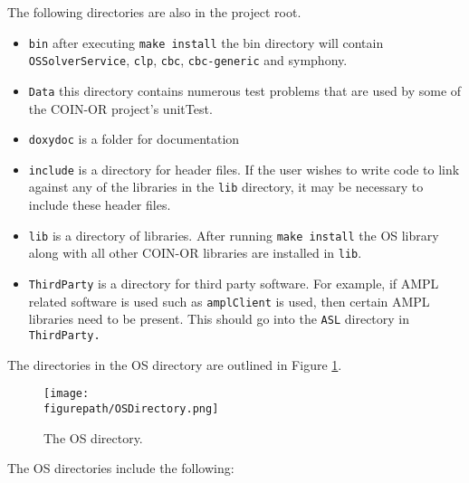 \documentclass[11pt]{article}
\newcommand{\figurepath}{./figures}
\newcounter{Fig}
\renewcommand{\_}{{\char"5F}}
\renewcommand{\{}{{\char"7B}}
\renewcommand{\}}{{\char"7D}}
\renewcommand{\^}{{\char"0D}}
\renewcommand{\'}{{\char"0D}}
\begin{document}
The following directories are also in the project root. 
\begin{itemize}
\item {\tt bin} after executing {\tt make install} the bin directory will contain {\tt OSSolverService}, {\tt clp}, {\tt cbc},  {\tt cbc-generic} and {symphony}.

\item {\tt Data} this directory contains numerous test problems that are used by some of the COIN-OR project's unitTest.

\item {\tt doxydoc} is a folder for documentation

\item {\tt include} is a directory for header files. If the user wishes to write code to link against any of the libraries in the {\tt lib} directory, it may be necessary to include these header files.

\item {\tt lib} is a directory of libraries. After running {\tt make install} the OS library along with all other COIN-OR libraries are installed in {\tt lib}.

\item {\tt ThirdParty} is a  directory for third party software. For example, if AMPL related software is used such as {\tt amplClient} is used, then certain AMPL libraries need to be present. This should go into the {\tt ASL} directory in {\tt ThirdParty.}
\end{itemize}




The directories in the OS directory are outlined in Figure \ref{figure:osdirectory}.


\begin{figure}
\centering
\texttt{[image: \\figurepath/OSDirectory.png]}
\caption{The OS directory.} 
\label{figure:osdirectory}
\end{figure}

The OS directories include the following:
\end{document}

